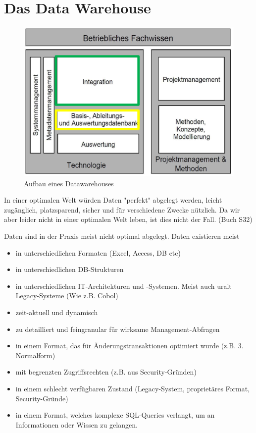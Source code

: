 \documentclass[a4paper, 11pt]{article}
\begin{document}
\section{Das Data Warehouse}

\begin{figure}
	\centering
	\includegraphics[keepaspectratio=true,height=10\baselineskip]{datawarehouse.PNG}
	\caption{Aufbau eines Datawarehouses}
	\label{fig:datawarehouse}
\end{figure}

In einer optimalen Welt würden Daten "perfekt" abgelegt werden, leicht zugänglich, platzsparend, sicher und für verschiedene Zwecke nützlich. Da wir aber leider nicht in einer optimalen Welt leben, ist dies nicht der Fall. (Buch S32)

Daten sind in der Praxis meist nicht optimal abgelegt. Daten existieren meist
\begin{itemize}
	\item in unterschiedlichen Formaten (Excel, Access, DB etc)
	\item in unterschiedlichen DB-Strukturen 
	\item in unterschiedlichen IT-Architekturen und -Systemen. Meist auch uralt Legacy-Systeme (Wie z.B. Cobol)
	\item zeit-aktuell und dynamisch
	\item zu detailliert und feingranular für wirksame Management-Abfragen
	\item in einem Format, das für Änderungstransaktionen optimiert wurde (z.B. 3. Normalform)
	\item mit begrenzten Zugriffsrechten (z.B. aus Security-Gründen)
	\item in einem schlecht verfügbaren Zustand (Legacy-System, proprietäres Format, Security-Gründe)
	\item in einem Format, welches komplexe SQL-Queries verlangt, um an Informationen oder Wissen zu gelangen.
\end{itemize}
\end{document}
